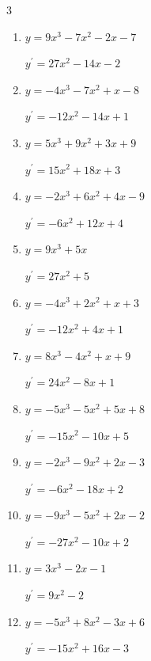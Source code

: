 \begin{multicols}{3}
\begin{enumerate}
        $\displaystyle y^{\prime}=-3x^{2}+4x-5$

  \item $y=9x^{3}-7x^{2}-2x-7$

        $\displaystyle y^{\prime}=27x^{2}-14x-2$

  \item $y=-4x^{3}-7x^{2}+x-8$

        $\displaystyle y^{\prime}=-12x^{2}-14x+1$

  \item $y=5x^{3}+9x^{2}+3x+9$

        $\displaystyle y^{\prime}=15x^{2}+18x+3$

  \item $y=-2x^{3}+6x^{2}+4x-9$

        $\displaystyle y^{\prime}=-6x^{2}+12x+4$

  \item $y=9x^{3}+5x$

        $\displaystyle y^{\prime}=27x^{2}+5$

\columnbreak %

\resetques

  \item $y=-4x^{3}+2x^{2}+x+3$

        $\displaystyle y^{\prime}=-12x^{2}+4x+1$

  \item $y=8x^{3}-4x^{2}+x+9$

        $\displaystyle y^{\prime}=24x^{2}-8x+1$

  \item $y=-5x^{3}-5x^{2}+5x+8$

        $\displaystyle y^{\prime}=-15x^{2}-10x+5$

  \item $y=-2x^{3}-9x^{2}+2x-3$

        $\displaystyle y^{\prime}=-6x^{2}-18x+2$

  \item $y=-9x^{3}-5x^{2}+2x-2$

        $\displaystyle y^{\prime}=-27x^{2}-10x+2$

  \item $y=3x^{3}-2x-1$

        $\displaystyle y^{\prime}=9x^{2}-2$

  \item $y=-5x^{3}+8x^{2}-3x+6$

        $\displaystyle y^{\prime}=-15x^{2}+16x-3$


\end{enumerate}
\end{multicols}
